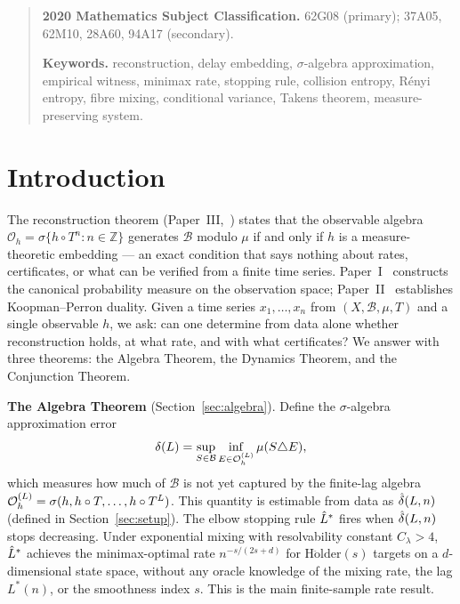 \begin{quote}\small
\textbf{2020 Mathematics Subject Classification.}
62G08 (primary); 37A05, 62M10, 28A60, 94A17 (secondary).

\textbf{Keywords.}
reconstruction, delay embedding, $\sigma$-algebra approximation,
empirical witness, minimax rate, stopping rule, collision entropy,
Rényi entropy, fibre mixing, conditional variance, Takens theorem,
measure-preserving system.
\end{quote}

\section{Introduction}
\label{sec:intro}

The reconstruction theorem (Paper~III,~\cite{mahon_paper3}) states that the
observable algebra $\mathcal{O}_h = \sigma\{h \circ T^n : n \in \mathbb{Z}\}$
generates $\mathcal{B}$ modulo $\mu$ if and only if $h$ is a measure-theoretic
embedding --- an exact condition that says nothing about rates, certificates,
or what can be verified from a finite time series.
Paper~I~\cite{mahon_paper1} constructs the canonical probability measure
on the observation space; Paper~II~\cite{mahon_paper2} establishes
Koopman--Perron duality.
Given a time series $x_1, \ldots, x_n$ from $(X, \mathcal{B}, \mu, T)$
and a single observable $h$, we ask: can one determine from data alone
whether reconstruction holds, at what rate, and with what certificates?
We answer with three theorems: the Algebra Theorem, the Dynamics Theorem,
and the Conjunction Theorem.

\textbf{The Algebra Theorem} (Section~\ref{sec:algebra}).
Define the $\sigma$-algebra approximation error
\[ \delta(L) = \sup_{S \in \mathcal{B}} \inf_{E \in \mathcal{O}_h^{(L)}} \mu(S \triangle E),\]
which measures how much of $\mathcal{B}$ is not yet captured by the
finite-lag algebra $\mathcal{O}_h^{(L)} = \sigma(h, h\circ T, \ldots, h \circ T^L)$.
This quantity is estimable from data as $\hat{\delta}(L,n)$ (defined
in Section~\ref{sec:setup}).
The elbow stopping rule $\hat{L}^*$ fires when $\hat{\delta}(L,n)$ stops decreasing.
Under exponential mixing with resolvability constant $C_\lambda > 4$,
$\hat{L}^*$ achieves the minimax-optimal rate $n^{-s/(2s+d)}$ for
$\mathrm{H\ddot{o}lder}(s)$ targets on a $d$-dimensional state space,
without any oracle knowledge of the mixing rate, the lag $L^*(n)$,
or the smoothness index $s$.
This is the main finite-sample rate result.

